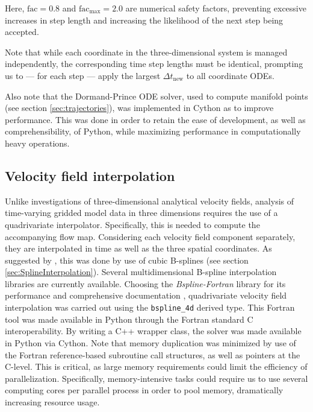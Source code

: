 \noindent Here, $\text{fac}=0.8$ and $\text{fac}_{\text{max}}=2.0$ are numerical safety factors, preventing excessive increases in step length and increasing the likelihood of the next step being accepted.

Note that while each coordinate in the three-dimensional system is managed independently, the corresponding time step lengths must be identical, prompting us to --- for each step --- apply the largest $\Delta t_{\text{new}}$ to all coordinate ODEs.

Also note that the Dormand-Prince ODE solver, used to compute manifold points (see section \ref{sec:trajectories}), was implemented in Cython as to improve performance. This was done in order to retain the ease of development, as well as comprehensibility, of Python, while maximizing performance in computationally heavy operations.



\subsection{Velocity field interpolation}\label{sec:velocity_interpolation}

Unlike investigations of three-dimensional analytical velocity fields, analysis of time-varying gridded model data in three dimensions requires the use of a quadrivariate interpolator. Specifically, this is needed to compute the accompanying flow map. Considering each velocity field component separately, they are interpolated in time as well as the three spatial coordinates. As suggested by \cite{OptimalInterpolation}, this was done by use of cubic B-splines (see section \ref{sec:SplineInterpolation}). Several multidimensional B-spline interpolation libraries are currently available. Choosing the \textit{Bspline-Fortran} library for its performance and comprehensive documentation \citep{Williams18}, quadrivariate velocity field interpolation was carried out using the \texttt{bspline\_}\texttt{4d} derived type. This Fortran tool was made available in Python through the Fortran standard C interoperability. By writing a C++ wrapper class, the solver was made available in Python via Cython. Note that memory duplication was minimized by use of the Fortran reference-based subroutine call structures, as well as pointers at the C-level. This is critical, as large memory requirements could limit the efficiency of parallelization. Specifically, memory-intensive tasks could require us to use several computing cores per parallel process in order to pool memory, dramatically increasing resource usage.

